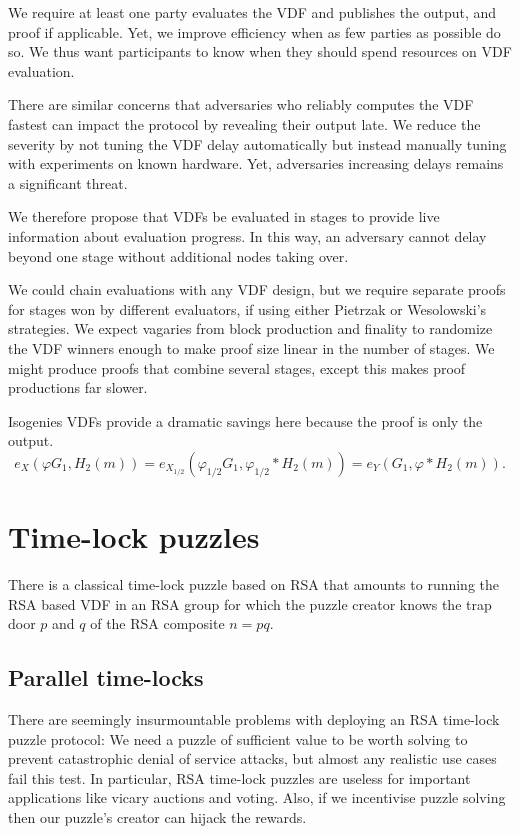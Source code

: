 \documentclass{article}
\newcommand\mathperiod{.}
\begin{document}
We require at least one party evaluates the VDF and publishes the output, and proof if applicable.  Yet, we improve efficiency when as few parties as possible do so.  We thus want participants to know when they should spend resources on VDF evaluation.

There are similar concerns that adversaries who reliably computes the VDF fastest can impact the protocol by revealing their output late.  We reduce the severity by not tuning the VDF delay automatically but instead manually tuning with experiments on known hardware.  Yet, adversaries increasing delays remains a significant threat.

We therefore propose that VDFs be evaluated in stages to provide live information about evaluation progress.  In this way, an adversary cannot delay beyond one stage without additional nodes taking over.  

We could chain evaluations with any VDF design, but we require separate proofs for stages won by different evaluators, if using either Pietrzak or Wesolowski's strategies.  We expect vagaries from block production and finality to randomize the VDF winners enough to make proof size linear in the number of stages.  We might produce proofs that combine several stages, except this makes proof productions far slower.

Isogenies VDFs provide a dramatic savings here because the proof is only the output.
$$ e_X( φ G_1, H_2(m) ) = e_{X_{1/2}}( φ_{1/2} G_1, φ_{1/2}* H_2(m) ) = e_Y( G_1, φ* H_2(m) ) \mathperiod $$


\section{Time-lock puzzles}


There is a classical time-lock puzzle based on RSA \cite{TLP} that
amounts to running the RSA based VDF in an RSA group for which the
puzzle creator knows the trap door $p$ and $q$ of the RSA composite
$n = p q$.  

\subsection{Parallel time-locks}

There are seemingly insurmountable problems with deploying an RSA
time-lock puzzle protocol:
We need a puzzle of sufficient value to be worth solving to prevent
catastrophic denial of service attacks, but almost any realistic use
cases fail this test.  In particular, RSA time-lock puzzles are
useless for important applications like vicary auctions and voting. 
Also, if we incentivise puzzle solving then our puzzle's creator can
hijack the rewards.  
\end{document}
